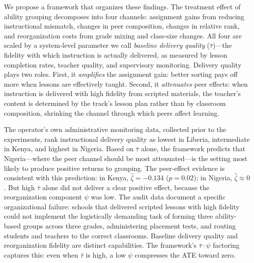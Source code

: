 \documentclass[11pt]{article}
\begin{document}
We propose a framework that organizes these findings. The treatment effect of ability grouping decomposes into four channels: assignment gains from reducing instructional mismatch, changes in peer composition, changes in relative rank, and reorganization costs from grade mixing and class-size changes. All four are scaled by a system-level parameter we call \emph{baseline delivery quality} ($\bar{\tau}$)---the fidelity with which instruction is actually delivered, as measured by lesson completion rates, teacher quality, and supervisory monitoring. Delivery quality plays two roles. First, it \emph{amplifies} the assignment gain: better sorting pays off more when lessons are effectively taught. Second, it \emph{attenuates} peer effects: when instruction is delivered with high fidelity from scripted materials, the teacher's content is determined by the track's lesson plan rather than by classroom composition, shrinking the channel through which peers affect learning.

The operator's own administrative monitoring data, collected prior to the experiments, rank instructional delivery quality as lowest in Liberia, intermediate in Kenya, and highest in Nigeria. Based on $\bar{\tau}$ alone, the framework predicts that Nigeria---where the peer channel should be most attenuated---is the setting most likely to produce positive returns to grouping. The peer-effect evidence is consistent with this prediction: in Kenya, $\hat{\zeta} = -0.134$ ($p = 0.02$); in Nigeria, $\hat{\zeta} \approx 0$. But high $\bar{\tau}$ alone did not deliver a clear positive effect, because the reorganization component $\psi$ was low. The audit data document a specific organizational failure: schools that delivered scripted lessons with high fidelity could not implement the logistically demanding task of forming three ability-based groups across three grades, administering placement tests, and routing students and teachers to the correct classrooms. Baseline delivery quality and reorganization fidelity are distinct capabilities. The framework's $\bar{\tau} \cdot \psi$ factoring captures this: even when $\bar{\tau}$ is high, a low $\psi$ compresses the ATE toward zero.
\end{document}
